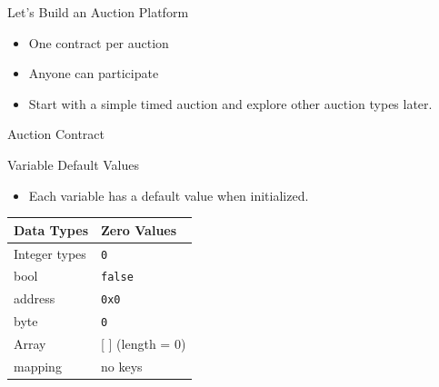 \documentclass[]{beamer}
\begin{document}
\begin{frame}{Let's Build an Auction Platform}
\begin{itemize}
	\item One contract per auction
	\item Anyone can participate
	\item Start with a simple timed auction and explore other auction types later.
\end{itemize}
	\begin{samplecode}{Auction Contract}
		
	\end{samplecode}
\end{frame}

\begin{frame}{Variable Default Values}
\begin{itemize}
	\item Each variable has a default value when initialized.
\end{itemize}

\begin{center}
\begin{table}
		\begin{tabular}{|ll|}
			\hline
			Data Types & Zero Values\\
			\hline
			Integer types & \texttt{0} \\
			bool &  \texttt{false} \\
			address & \texttt{0x0} \\
			byte & \texttt{0} \\
			Array & [ ] (length = 0) \\
			mapping & no keys \\
			\hline
		\end{tabular}
		\label{tbl:simpletable}
	\end{table}	
\end{center}
\end{frame}
\end{document}
